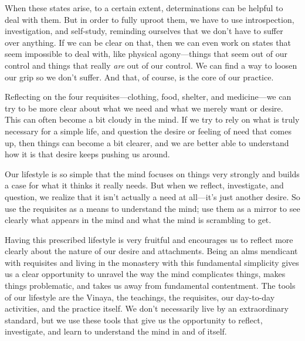 When these states arise, to a certain extent, determinations can be 
helpful to deal with them. But in order to fully uproot them, we have 
to use introspection, investigation, and self-study, reminding 
ourselves that we don't have to suffer over anything. If we can be 
clear on that, then we can even work on states that seem impossible to 
deal with, like physical agony---things that seem out of our control 
and things that really \emph{are} out of our control. We can find a way 
to loosen our grip so we don't suffer. And that, of course, is the core 
of our practice.


Reflecting on the four requisites---clothing, food, shelter, and 
medicine---we can try to be more clear about what we need and what we 
merely want or desire. This can often become a bit cloudy in the mind. 
If we try to rely on what is truly necessary for a simple life, and 
question the desire or feeling of need that comes up, then things can 
become a bit clearer, and we are better able to understand how it is 
that desire keeps pushing us around.

Our lifestyle is so simple that the mind focuses on things very 
strongly and builds a case for what it thinks it really needs. But when 
we reflect, investigate, and question, we realize that it isn't 
actually a need at all---it's just another desire. So use the 
requisites as a means to understand the mind; use them as a mirror to 
see clearly what appears in the mind and what the mind is scrambling to 
get.

Having this prescribed lifestyle is very fruitful and encourages us to 
reflect more clearly about the nature of our desire and attachments. 
Being an alms mendicant with requisites and living in the monastery 
with this fundamental simplicity gives us a clear opportunity to 
unravel the way the mind complicates things, makes things problematic, 
and takes us away from fundamental contentment. The tools of our 
lifestyle are the Vinaya, the teachings, the requisites, our day-to-day 
activities, and the practice itself. We don't necessarily live by an 
\mbox{extraordinary} standard, but we use these tools that give us the 
opportunity to reflect, investigate, and learn to understand the mind 
in and of itself.


